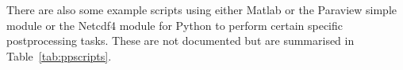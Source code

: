 \documentclass[11pt]{article}
\begin{document}
There are also some example scripts using either Matlab or the Paraview simple module or the Netcdf4 module
for Python to perform certain specific postprocessing tasks.
These are not documented but are summarised in Table~\ref{tab:ppscripts}. 










\end{document}

